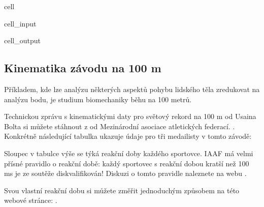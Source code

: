 \documentclass[letterpaper,10pt,english]{jupyterBook}
\begin{document}
\begin{sphinxuseclass}{cell}
\begin{sphinxVerbatimInput}
\begin{sphinxuseclass}{cell_input}
\begin{sphinxVerbatim}[commandchars=\\\{\}]
 
\end{sphinxVerbatim}

\end{sphinxuseclass}\end{sphinxVerbatimInput}
\begin{sphinxVerbatimOutput}

\begin{sphinxuseclass}{cell_output}
\noindent{}

\end{sphinxuseclass}\end{sphinxVerbatimOutput}

\end{sphinxuseclass}

\subsection{Kinematika závodu na 100 m}
\label{\detokenize{Prednasky/1_2_Kinematika_v_1D:kinematika-zavodu-na-100-m}}
\sphinxAtStartPar
Příkladem, kde lze analýzu některých aspektů pohybu lidského těla zredukovat na analýzu bodu, je studium biomechaniky běhu na 100 metrů.

\sphinxAtStartPar
Technickou zprávu s kinematickými daty pro světový rekord na 100 m od Usaina Bolta si můžete stáhnout z  od Mezinárodní asociace atletických federací.
. Konkrétně následující tabulka ukazuje údaje pro tři medailisty v tomto závodě:



\sphinxAtStartPar
Sloupec  v tabulce výše se týká reakční doby každého sportovce. IAAF má velmi přísné pravidlo o reakční době: každý sportovec s reakční dobou kratší než 100 ms je ze soutěže diskvalifikován! Diskuzi o tomto pravidle naleznete na webu .

\sphinxAtStartPar
Svou vlastní reakční dobu si můžete změřit jednoduchým způsobem na této webové stránce: .
\end{document}

